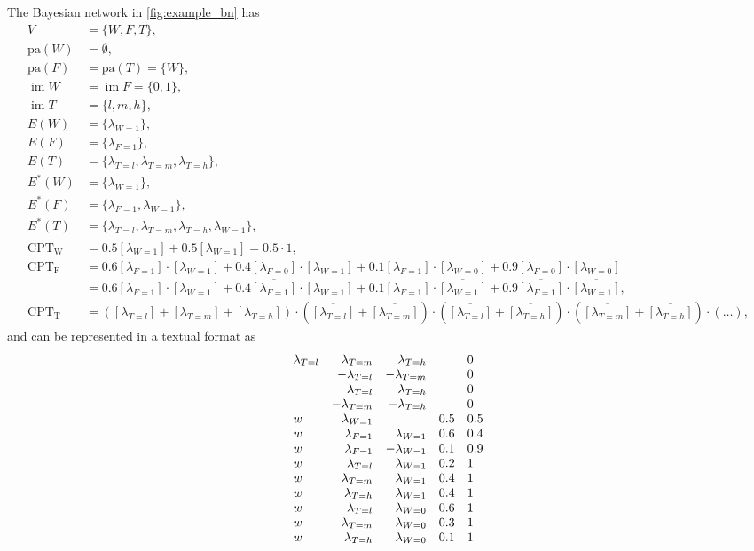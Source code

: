 \documentclass{article}
\theoremstyle{definition}
\theoremstyle{remark}
\DeclareMathOperator{\im}{im}
\begin{document}
The Bayesian network in \cref{fig:example_bn} has
\begin{align*}
  V &= \{ W, F, T \}, \\
  \mathrm{pa}(W) &= \emptyset, \\
  \mathrm{pa}(F) &= \mathrm{pa}(T) = \{ W \}, \\
  \im W &= \im F = \{ 0, 1 \}, \\
  \im T &= \{ l, m, h \}, \\
  E(W) &= \{ \lambda_{W=1} \}, \\
  E(F) &= \{ \lambda_{F=1} \}, \\
  E(T) &= \{ \lambda_{T=l}, \lambda_{T=m}, \lambda_{T=h} \}, \\
  E^*(W) &= \{ \lambda_{W=1} \}, \\
  E^*(F) &= \{ \lambda_{F=1}, \lambda_{W=1} \}, \\
  E^*(T) &= \{ \lambda_{T=l}, \lambda_{T=m}, \lambda_{T=h}, \lambda_{W=1} \}, \\
  \mathrm{CPT_W} &= 0.5[\lambda_{W=1}]+0.5\overline{[\lambda_{W=1}]} = 0.5 \cdot 1, \\
  \mathrm{CPT_F} &= 0.6[\lambda_{F=1}] \cdot [\lambda_{W=1}] + 0.4[\lambda_{F=0}] \cdot [\lambda_{W=1}] + 0.1[\lambda_{F=1}] \cdot [\lambda_{W=0}] + 0.9[\lambda_{F=0}] \cdot [\lambda_{W=0}] \\
    &= 0.6[\lambda_{F=1}] \cdot [\lambda_{W=1}] + 0.4\overline{[\lambda_{F=1}]} \cdot [\lambda_{W=1}] + 0.1[\lambda_{F=1}] \cdot \overline{[\lambda_{W=1}]} + 0.9\overline{[\lambda_{F=1}]} \cdot \overline{[\lambda_{W=1}]}, \\
  \mathrm{CPT_T} &= ([\lambda_{T=l}] + [\lambda_{T=m}] + [\lambda_{T=h}]) \cdot (\overline{[\lambda_{T=l}]} + \overline{[\lambda_{T=m}]}) \cdot (\overline{[\lambda_{T=l}]} + \overline{[\lambda_{T=h}]}) \cdot (\overline{[\lambda_{T=m}]} + \overline{[\lambda_{T=h}]}) \cdot (\dots),
\end{align*}
and can be represented in a textual format as
\[
  \begin{array}{l r r l l}
    \lambda\sb{T=l} &\lambda\sb{T=m} &\lambda\sb{T=h} & &0 \\
                    &-\lambda\sb{T=l} &-\lambda\sb{T=m} & &0 \\
                    &-\lambda\sb{T=l} &-\lambda\sb{T=h} & &0 \\
                    &-\lambda\sb{T=m} &-\lambda\sb{T=h} & &0 \\
    w &\lambda\sb{W=1} & &0.5 &0.5 \\
    w &\lambda\sb{F=1} &\lambda\sb{W=1} &0.6 &0.4 \\
    w &\lambda\sb{F=1} &-\lambda\sb{W=1} &0.1 &0.9 \\
    w &\lambda\sb{T=l} &\lambda\sb{W=1} &0.2 &1 \\
    w &\lambda\sb{T=m} &\lambda\sb{W=1} &0.4 &1 \\
    w &\lambda\sb{T=h} &\lambda\sb{W=1} &0.4 &1 \\
    w &\lambda\sb{T=l} &\lambda\sb{W=0} &0.6 &1 \\
    w &\lambda\sb{T=m} &\lambda\sb{W=0} &0.3 &1 \\
    w &\lambda\sb{T=h} &\lambda\sb{W=0} &0.1 &1
  \end{array}
\]
\end{document}
